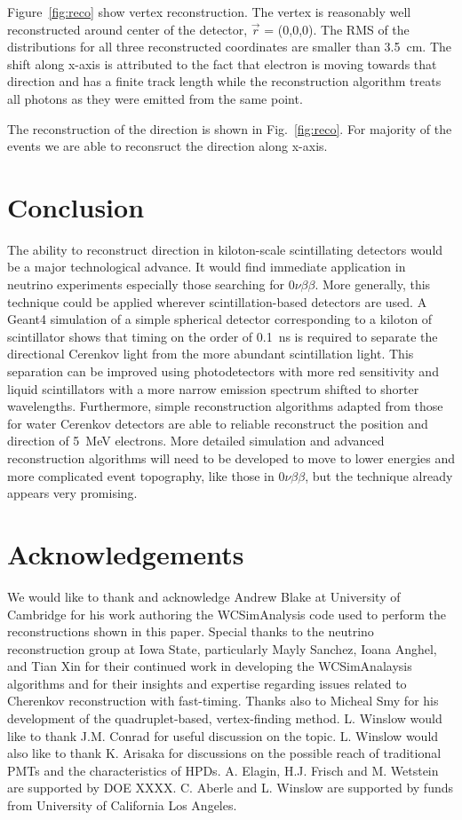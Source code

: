 \documentclass[aps,prc,twocolumn,groupedaddress,showpacs,amsmath,amssymb,floatfix,superscriptaddress]{revtex4}
\begin{document}
Figure~\ref{fig:reco} show vertex reconstruction. The vertex is reasonably well reconstructed around center of the detector, $\vec{r}$ = (0,0,0). The RMS of the distributions for all three reconstructed coordinates are smaller than 3.5~cm. The shift along x-axis is attributed to the fact that electron is moving towards that direction and has a finite track length while the reconstruction algorithm treats all photons as they were emitted from the same point.

The reconstruction of the direction is shown in Fig.~\ref{fig:reco}. For majority of the events we are able to reconsruct the direction along x-axis.

\section{Conclusion}
The ability to reconstruct direction in kiloton-scale scintillating detectors would be a major technological advance. It would find immediate application in neutrino experiments especially those searching for $0\nu\beta\beta$. More generally, this technique could be applied wherever scintillation-based detectors are used. A Geant4 simulation of a simple spherical detector corresponding to a kiloton of scintillator shows that timing on the order of 0.1~ns is required to separate the directional Cerenkov light from the more abundant scintillation light. This separation can be improved using photodetectors with more red sensitivity and liquid scintillators with a more narrow emission spectrum shifted to shorter wavelengths. Furthermore, simple reconstruction algorithms adapted from those for water Cerenkov detectors are able to reliable reconstruct the position and direction of 5~MeV electrons. More detailed simulation and advanced reconstruction algorithms will need to be developed to move to lower energies and more complicated event topography, like those in $0\nu\beta\beta$, but the technique already appears very promising.


\section{Acknowledgements}
We would like to thank and acknowledge Andrew Blake at University of Cambridge for his work authoring the WCSimAnalysis code used to perform the reconstructions shown in this paper. Special thanks to the neutrino reconstruction group at Iowa State, particularly Mayly Sanchez, Ioana Anghel, and Tian Xin for their continued work in developing the WCSimAnalaysis algorithms and for their insights and expertise regarding issues related to Cherenkov reconstruction with fast-timing. Thanks also to Micheal Smy for his development of the quadruplet-based, vertex-finding method. L. Winslow would like to thank J.M. Conrad for useful discussion on the topic. L. Winslow would also like to thank K. Arisaka for discussions on the possible reach of traditional PMTs and the characteristics of HPDs. A. Elagin, H.J. Frisch and M. Wetstein are supported by DOE XXXX. C. Aberle and L. Winslow are supported by funds from University of California Los Angeles.

 
\end{document}

